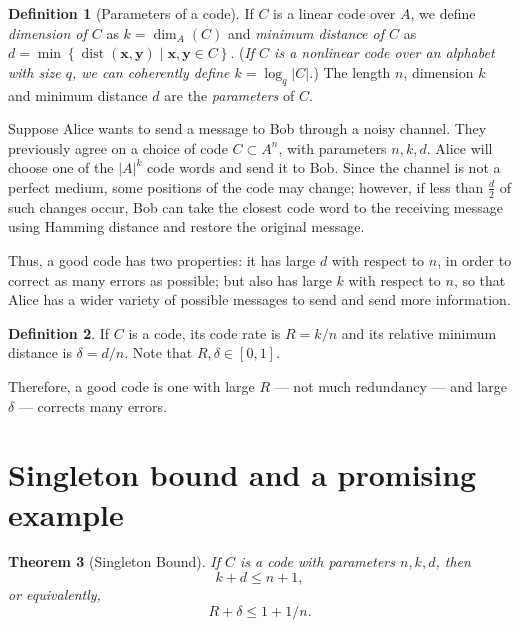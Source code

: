 \documentclass[11pt]{amsart}
\newtheorem{thm}{Theorem}[section]
\theoremstyle{definition}
\newtheorem{defn}[thm]{Definition}
\theoremstyle{example}
\theoremstyle{remark}
\numberwithin{equation}{section}
\DeclareMathOperator{\dist}{dist}
\DeclareMathOperator{\dimension}{dim}
\begin{document}
\begin{defn}[Parameters of a code]
    If $C$ is a linear code over $A$, we define \emph{dimension of $C$} as $k = \dimension_A(C)$ and \emph{minimum distance of $C$} as $d = \min\left\{\dist(\mathbf{x}, \mathbf{y}) \mid \mathbf{x}, \mathbf{y} \in C\right\}$. (\emph{If $C$ is a nonlinear code over an alphabet with size $q$, we can coherently define $k = \log_q{\left|C\right|}$.}) The length $n$, dimension $k$ and minimum distance $d$ are the \emph{parameters} of $C$.
\end{defn}

Suppose Alice wants to send a message to Bob through a noisy channel. They previously agree on a choice of code $C \subset A^n$, with parameters $n, k, d$. Alice will choose one of the $|A|^k$ code words and send it to Bob. Since the channel is not a perfect medium, some positions of the code may change; however, if less than $\frac{d}{2}$ of such changes occur, Bob can take the closest code word to the receiving message using Hamming distance and restore the original message.

Thus, a good code has two properties: it has large $d$ with respect to $n$, in order to correct as many errors as possible; but also has large $k$ with respect to $n$, so that Alice has a wider variety of possible messages to send and send more information.

\begin{defn}
    If $C$ is a code, its code rate is $R = k/n$ and its relative minimum distance is $\delta = d/n$. Note that $R, \delta \in [0, 1]$.
\end{defn}

Therefore, a good code is one with large $R$ --- not much redundancy --- and large $\delta$ --- corrects many errors. 

\section{Singleton bound and a promising example} \label{s:singleton}
\begin{thm}[Singleton Bound]\label{thm:singleton_bound}
If $C$ is a code with parameters $n, k, d$, then 
	\begin{equation}
		k + d \le n + 1,
	\end{equation} 
	or equivalently, 
	\begin{equation}
		R + \delta \le 1 + 1/n.
	\end{equation}
\end{thm}
\end{document}

